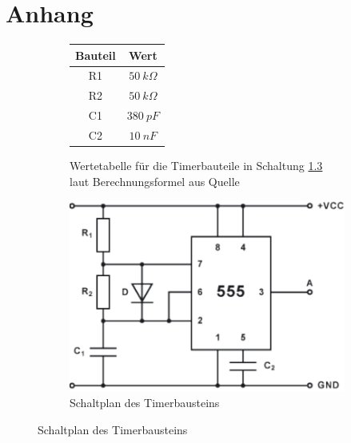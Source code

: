 \chapter{Anhang}
\label{ch:anhang}

\begin{figure}[h]
	\vspace{2cm}
	\begin{subfigure}{\textwidth}
		\centering
		\begin{tabular}{|c|c|}
			\hline Bauteil & Wert \\ 
			\hline R1 & $50 \ k\Omega$ \\ 
			\hline R2 & $50 \ k\Omega$ \\ 
			\hline C1 & $380 \ pF$ \\ 
			\hline C2 & $10 \ nF$ \\ 
			\hline 
		\end{tabular} 
		\caption{Wertetabelle für die Timerbauteile in Schaltung \ref{fig:schaltplan_ne555} laut Berechnungsformel aus Quelle \cite{ELKO}}
		\label{fig:wertetabelle_ne555}
	\end{subfigure}
	\par\bigskip
	\vspace{1.5cm}
	\centering
	\begin{subfigure}{\textwidth}
		\includegraphics[height=.4\textheight]{images/ne555_astabile_kippstufe.pdf}
		\caption{Schaltplan des Timerbausteins \cite{ELKO}}
		\label{fig:schaltplan_ne555}
	\end{subfigure}
\end{figure}
